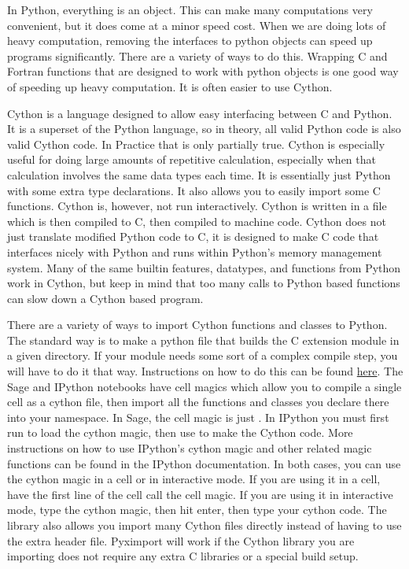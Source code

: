 

In Python, everything is an object.
This can make many computations very convenient, but it does come at a minor speed cost.
When we are doing lots of heavy computation, removing the interfaces to python objects can speed up programs significantly.
There are a variety of ways to do this.
Wrapping C and Fortran functions that are designed to work with python objects is one good way of speeding up heavy computation.
It is often easier to use Cython.

Cython is a language designed to allow easy interfacing between C and Python.
It is a superset of the Python language, so in theory, all valid Python code is also valid Cython code.
In Practice that is only partially true.
Cython is especially useful for doing large amounts of repetitive calculation, especially when that calculation involves the same data types each time.
It is essentially just Python with some extra type declarations.
It also allows you to easily import some C functions.
Cython is, however, not run interactively.
Cython is written in a  file which is then compiled to C, then compiled to machine code.
Cython does not just translate modified Python code to C, it is designed to make C code that interfaces nicely with Python and runs within Python's memory management system.
Many of the same builtin features, datatypes, and functions from Python work in Cython, but keep in mind that too many calls to Python based functions can slow down a Cython based program.

There are a variety of ways to import Cython functions and classes to Python.
The standard way is to make a python file that builds the C extension module in a given directory.
If your module needs some sort of a complex compile step, you will have to do it that way.
Instructions on how to do this can be found \href{http://docs.cython.org/src/reference/compilation.html}{here}.
The Sage and IPython notebooks have cell magics which allow you to compile a single cell as a cython file, then import all the functions and classes you declare there into your namespace.
In Sage, the cell magic is just .
In IPython you must first run  to load the cython magic, then use  to make the Cython code.
More instructions on how to use IPython's cython magic and other related magic functions can be found in the IPython documentation.
In both cases, you can use the cython magic in a cell or in interactive mode.
If you are using it in a cell, have the first line of the cell call the cell magic.
If you are using it in interactive mode, type the cython magic, then hit enter, then type your cython code.
The library  also allows you import many Cython files directly instead of having to use the extra header file.
Pyximport will work if the Cython library you are importing does not require any extra C libraries or a special build setup.

